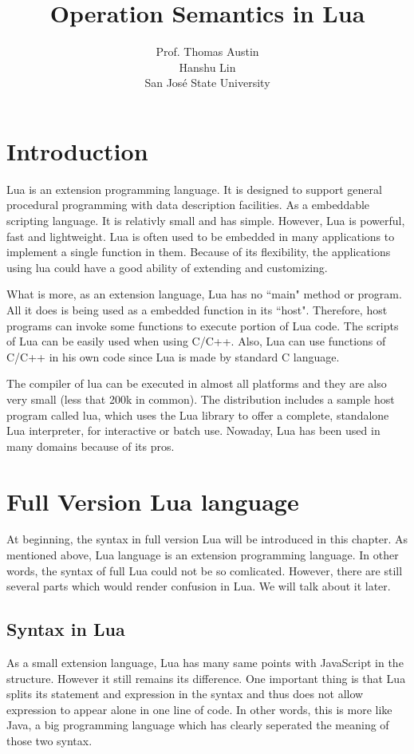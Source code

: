 \documentclass{article}
\title{ Operation Semantics in Lua}
\author{
  Prof. Thomas Austin\\
  Hanshu Lin \\
  San Jos\'{e} State University \\
  }
\date{}
\begin{document}
\maketitle

\section{Introduction}

Lua is an extension programming language. It is designed to support general procedural programming with data description facilities. As a embeddable scripting language. It is relativly small and has simple. However, Lua is powerful, fast and lightweight. Lua is often used to be embedded in many applications to implement a single function in them. Because of its flexibility, the applications using lua could have a good ability of extending and customizing.

What is more, as an extension language, Lua has no ``main" method or program. All it does is being used as a embedded function in its ``host". Therefore, host programs can invoke some functions to execute portion of Lua code. The scripts of Lua can be easily used when using C/C++. Also, Lua can use functions of C/C++ in his own code since Lua is made by standard C language.

The compiler of lua can be executed in almost all platforms and they are also very small (less that 200k in common). The distribution includes a sample host program called lua, which uses the Lua library to offer a complete, standalone Lua interpreter, for interactive or batch use. Nowaday, Lua has been used in many domains because of its pros.

\section{Full Version Lua language}
At beginning, the syntax in full version Lua will be introduced in this chapter. As mentioned above, Lua language is an extension programming language. In other words, the syntax of full Lua could not be so comlicated. However, there are still several parts which would render confusion in Lua. We will talk about it later.  

\subsection{Syntax in Lua}
As a small extension language, Lua has many same points with JavaScript in the structure. However it still remains its difference. One important thing is that Lua splits its statement and expression in the syntax and thus does not allow expression to appear alone in one line of code. In other words, this is more like Java, a big programming language which has clearly seperated the meaning of those two syntax.
\end{document}
